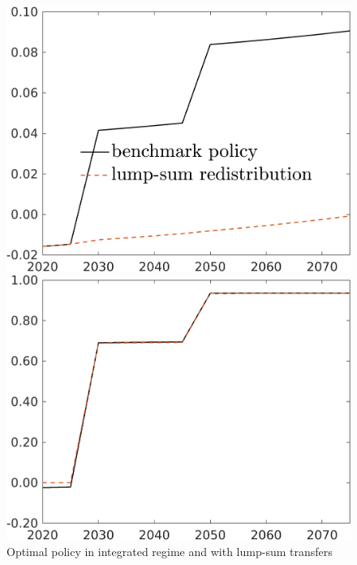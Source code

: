 \begin{figure}[h!!]
	\centering
	\caption{Optimal policy in integrated regime and with lump-sum transfers}\label{fig:bench_lumpsum_pol}
	
	\begin{minipage}[]{0.32\textwidth}
		\includegraphics[width=1\textwidth]{../../codding_model/own_basedOnFried/optimalPol_190722_tidiedUp/figures/all_July22/comp_notaul4_OPT_T_NoTaus_taul_spillover0_noskill0_sep1_xgrowth0_etaa0.79_lgd1.png}
	\end{minipage}
	\begin{minipage}[]{0.32\textwidth}
		\includegraphics[width=1\textwidth]{../../codding_model/own_basedOnFried/optimalPol_190722_tidiedUp/figures/all_July22/comp_notaul4_OPT_T_NoTaus_tauf_spillover0_noskill0_sep1_xgrowth0_etaa0.79_lgd0.png}

\end{minipage}
\end{figure}
